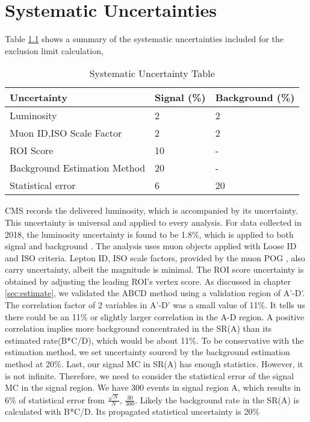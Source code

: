 \clearpage
\chapter{Systematic Uncertainties}\label{sec:systs}
Table \ref{tab:systab} shows a summary of the systematic uncertainties included for the exclusion limit calculation,

\begin{table}[htb!]
  \caption{Systematic Uncertainty Table}
  \begin{center}
    \begin{tabular}{l|l|l}\hline
     Uncertainty    & Signal (\%) & Background (\%)\\
      \hline
     Luminosity     & 2 & 2\\
      \hline
     Muon ID,ISO Scale Factor     & 2 & 2 \\
      \hline
     ROI Score      & 10 & -\\
      \hline
     Background Estimation Method     & 20 & - \\
      \hline
     Statistical error     & 6 & 20 \\
      \hline
    \end{tabular}
    \label{tab:systab}
  \end{center}
\end{table}
CMS records the delivered luminosity, which is accompanied by its uncertainty.
This uncertainty is universal and applied to every analysis.
For data collected in 2018, the luminosity uncertainty is found to be 1.8\%, which is applied to both signal and background \cite{lumiUnc18}.
The analysis uses muon objects applied with Loose ID and ISO criteria.
Lepton ID, ISO scale factors, provided by the muon POG \cite{muonpog}, also carry uncertainty, albeit the magnitude is minimal.
The ROI score uncertainty is obtained by adjusting the leading ROI's vertex score.
As discussed in chapter \ref{sec:estimate}, we validated the ABCD method using a validation region of A'-D'.
The correlation factor of 2 variables in A'-D' was a small value of 11\%.
It tells us there could be an 11\% or slightly larger correlation in the A-D region.
A positive correlation implies more background concentrated in the SR(A) than its estimated rate(B*C/D), which would be about 11\%.
To be conservative with the estimation method, we set uncertainty sourced by the background estimation method at 20\%.
Last, our signal MC in SR(A) has enough statistics.
However, it is not infinite.
Therefore, we need to consider the statistical error of the signal MC in the signal region.
We have 300 events in signal region A, which results in 6\% of statistical error from $\frac{\sqrt{N}}{N}$, $\frac{30}{300}$.
Likely the background rate in the SR(A) is calculated with B*C/D.
Its propagated statistical uncertainty is 20\%
